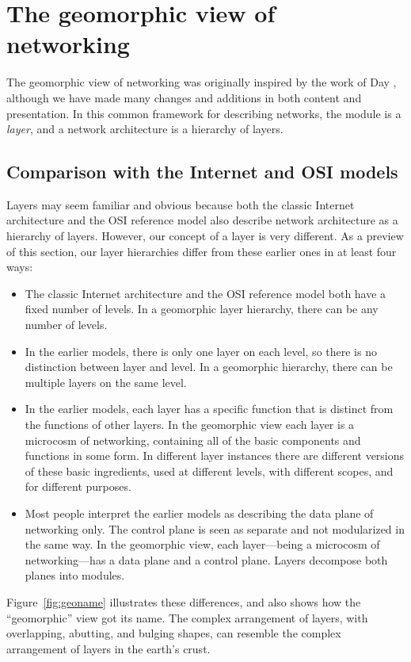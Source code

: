 \section{The geomorphic view of networking}
\label{sec:sec2}

The geomorphic
view of networking was originally inspired by the work of Day \cite{pna},
although we have made many changes and additions in both content and
presentation.
In this common framework for describing networks,
the module is a
{\it layer}, and a network architecture is a hierarchy of layers.

\subsection{Comparison with the Internet and OSI models}
Layers may seem familiar and obvious because both the classic Internet
architecture \cite{philo} and the
OSI reference model \cite{OSI}
also describe network architecture as a hierarchy of layers.
However,
our concept of a layer is very different.
As a preview of this section, our layer hierarchies differ from these
earlier ones in at least four ways:
\begin{itemize}
\item
The classic Internet architecture and the OSI reference model both have
a fixed number of levels.
In a geomorphic layer hierarchy, there can be any number of levels.
\item
In the earlier models, there is only one layer on each level, so there
is no distinction between layer and level.
In a geomorphic hierarchy, there can be multiple layers on the same
level.
\item
In the earlier models, each layer has a specific function that is
distinct from the functions of other layers.
In the geomorphic view
each layer is a microcosm of networking, containing all of the basic
components and functions in some form.
In different layer instances there are different versions of these
basic ingredients, used at
different levels, with different scopes, and for
different purposes.
\item
Most people interpret the earlier models as describing the data
plane of networking only.
The control plane is seen as separate and not modularized in the
same way.
In the geomorphic view, each layer---being a microcosm of
networking---has a data plane and a control plane.
Layers decompose both planes into modules.
\end{itemize}
Figure~\ref{fig:geoname} illustrates these differences, and also
shows how the ``geomorphic'' view got its name.
The complex arrangement of layers, with overlapping, abutting, and
bulging shapes, can resemble the complex arrangement of layers in the
earth's crust.

